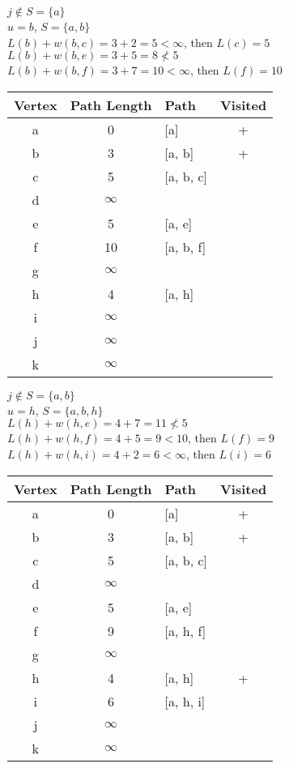 \documentclass[12pt]{article}
\begin{document}
$j \notin S = \{a\}$ \\
$u = b$, $S = \{a, b\}$ \\
$L(b) + w(b, c) = 3 + 2 = 5 < \infty$, then $L(c) = 5$ \\
$L(b) + w(b, e) = 3 + 5 = 8 \not< 5$ \\
$L(b) + w(b, f) = 3 + 7 = 10 < \infty$, then $L(f) = 10$ \\

\begin{center}
\begin{tabular}{c|c|l|c}
    Vertex & Path Length & Path & Visited \\
    \hline
    a & 0 & [a] & + \\
    b & 3 & [a, b] & + \\
    c & 5 & [a, b, c] & \\
    d & $\infty$ & & \\
    e & 5 & [a, e] & \\
    f & 10 & [a, b, f] & \\
    g & $\infty$ & & \\
    h & 4 & [a, h] & \\
    i & $\infty$ & & \\
    j & $\infty$ & & \\
    k & $\infty$ & &
\end{tabular}
\end{center}

$j \notin S = \{a, b\}$ \\
$u = h$, $S = \{a, b, h\}$ \\
$L(h) + w(h, e) = 4 + 7 = 11 \not< 5$ \\
$L(h) + w(h, f) = 4 + 5 = 9 < 10$, then $L(f) = 9$ \\
$L(h) + w(h, i) = 4 + 2 = 6 < \infty$, then $L(i) = 6$ \\

\begin{center}
\begin{tabular}{c|c|l|c}
    Vertex & Path Length & Path & Visited \\
    \hline
    a & 0 & [a] & + \\
    b & 3 & [a, b] & + \\
    c & 5 & [a, b, c] & \\
    d & $\infty$ & & \\
    e & 5 & [a, e] & \\
    f & 9 & [a, h, f] & \\
    g & $\infty$ & & \\
    h & 4 & [a, h] & + \\
    i & 6 & [a, h, i] & \\
    j & $\infty$ & & \\
    k & $\infty$ & &
\end{tabular}
\end{center}
\end{document}
